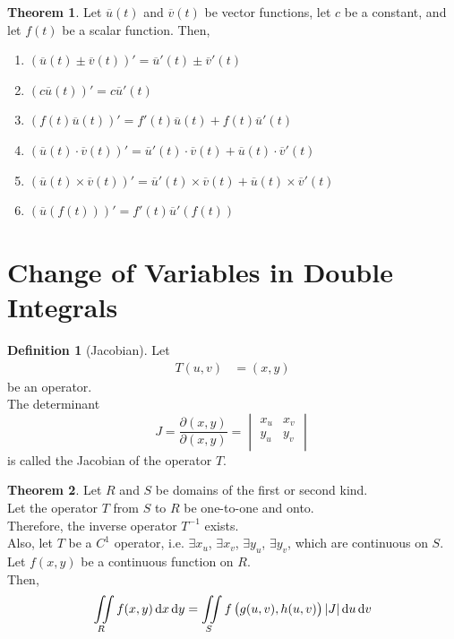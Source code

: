 \documentclass[fleqn, a4paper, 12pt, twoside]{article}
\theoremstyle{definition}
\newtheorem{definition}{Definition}
\theoremstyle{theorem}
\newtheorem{theorem}{Theorem}
\begin{document}
{\begin{theorem}
	Let $\overline{u}(t)$ and $\overline{v}(t)$ be vector functions, let $c$ be a constant, and let $f(t)$ be a scalar function.
	Then,
	\begin{enumerate}
		\item $\left( \overline{u}(t) \pm \overline{v}(t) \right)' = \overline{u}'(t) \pm \overline{v}'(t)$
		\item $\left( c \overline{u}(t) \right)' = c \overline{u}'(t)$
		\item $\left( f(t) \overline{u}(t) \right)' = f'(t) \overline{u}(t) + f(t) \overline{u}'(t)$
		\item $\left( \overline{u}(t) \cdot \overline{v}(t) \right)' = \overline{u}'(t) \cdot \overline{v}(t) + \overline{u}(t) \cdot \overline{v}'(t)$
		\item $\left( \overline{u}(t) \times \overline{v}(t) \right)' = \overline{u}'(t) \times \overline{v}(t) + \overline{u}(t) \times \overline{v}'(t)$
		\item $\left( \overline{u}\left( f(t) \right) \right)' = f'(t) \overline{u}'\left( f(t) \right)$
	\end{enumerate}
\end{theorem}

\section{Change of Variables in Double Integrals}

\begin{definition}[Jacobian]
	Let
	\begin{align*}
		T(u,v) & = (x,y)
	\end{align*}
	be an operator.\\
	The determinant
	\begin{equation*}
		J = \frac{\partial(x,y)}{\partial(x,y)} =
			\begin{vmatrix}
				x_u & x_v \\
				y_u & y_v \\
			\end{vmatrix}
	\end{equation*}
	is called the Jacobian of the operator $T$.
\end{definition}

\begin{theorem}
	Let $R$ and $S$ be domains of the first or second kind.\\
	Let the operator $T$ from $S$ to $R$ be one-to-one and onto.\\
	Therefore, the inverse operator $T^{-1}$ exists.\\
	Also, let $T$ be a $C^1$ operator, i.e. $\exists x_u$, $\exists x_v$, $\exists y_u$, $\exists y_v$, which are continuous on $S$.\\
	Let $f(x,y)$ be a continuous function on $R$.\\
	Then,
	\begin{equation*}
		\iint\limits_{R} f(x,y) \dif x \dif y = \iint\limits_{S} f\left( g(u,v), h(u,v) \right) |J| \dif u \dif v
	\end{equation*}
\end{theorem}

}
\end{document}
